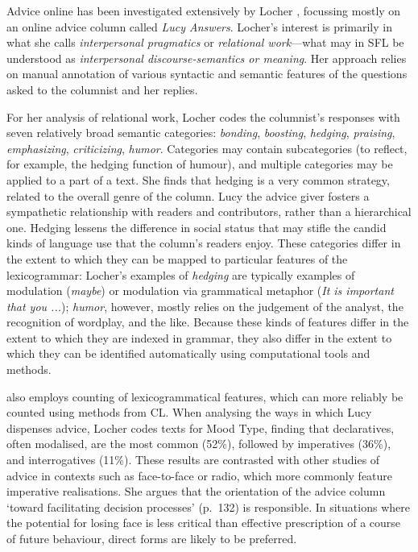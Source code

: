 Advice online has been investigated extensively by Locher \parencite*{locher2006advice,locher_health_2010}, focussing mostly on an online advice column called \emph{Lucy Answers}. Locher's interest is primarily in what she calls \emph{interpersonal pragmatics} or \emph{relational work}---what may in \gls{SFL} be understood as \emph{interpersonal \glspl{discourse-semantic} or meaning}. Her approach relies on manual annotation of various syntactic and semantic features of the questions asked to the columnist and her replies. 

For her analysis of relational work, Locher codes the columnist's responses with seven relatively broad semantic categories: \emph{bonding}, \emph{boosting}, \emph{hedging}, \emph{praising}, \emph{emphasizing}, \emph{criticizing}, \emph{humor}. Categories may contain subcategories (to reflect, for example, the hedging function of humour), and multiple categories may be applied to a part of a text. She finds that hedging is a very common strategy, related to the overall genre of the column. Lucy the advice giver fosters a sympathetic relationship with readers and contributors, rather than a hierarchical one. Hedging lessens the difference in social status that may stifle the candid kinds of language use that the column's readers enjoy. These categories differ in the extent to which they can be mapped to particular features of the \gls{lexicogrammar}: Locher's examples of \emph{hedging} are typically examples of modulation (\emph{maybe}) or modulation via grammatical metaphor (\emph{It is important that you ...}); \emph{humor}, however, mostly relies on the judgement of the analyst, the recognition of wordplay, and the like. Because these kinds of features differ in the extent to which they are indexed in grammar, they also differ in the extent to which they can be identified automatically using computational tools and methods.

\textcite{locher2006advice} also employs counting of lexicogrammatical features, which can more reliably be counted using methods from \gls{CL}. When analysing the ways in which Lucy dispenses advice, Locher codes texts for Mood Type, finding that declaratives, often modalised, are the most common (52\%), followed by imperatives (36\%), and interrogatives (11\%). These results are contrasted with other studies of advice in contexts such as face\hyp{}to\hyp{}face or radio, which more commonly feature imperative realisations. She argues that the orientation of the advice column `toward facilitating decision processes' (p.~132) is responsible. In situations where the potential for losing face is less critical than effective prescription of a course of future behaviour, direct forms are likely to be preferred.

